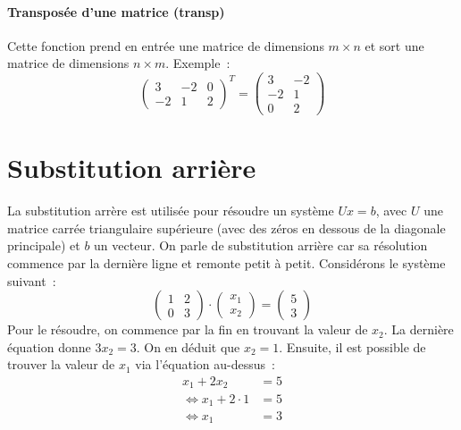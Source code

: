 \documentclass[a4paper, 12pt]{article}
\begin{document}
\paragraph{Transposée d'une matrice (transp)}
Cette fonction prend en entrée une matrice de dimensions $m \times n$ et sort une matrice de dimensions $n \times m$. Exemple~:
\begin{equation*}
     {\begin{pmatrix} 3  & -2 & 0 \\ -2 &  1 & 2   \end{pmatrix}}^T
    = \begin{pmatrix} 3  & -2 \\ -2 &  1 \\ 0 & 2  \end{pmatrix}
\end{equation*}

\newpage
\section{Substitution arrière}\label{app:back_sub}
La substitution arrère est utilisée pour résoudre un système $Ux = b$, avec $U$ une matrice carrée triangulaire supérieure (avec des zéros en dessous de la diagonale principale) et $b$ un vecteur. On parle de substitution arrière car sa résolution commence par la dernière ligne et remonte petit à petit. Considérons le système suivant~:
\begin{equation*}
          \begin{pmatrix} 1 & 2 \\ 0 & 3 \end{pmatrix}
    \cdot \begin{pmatrix} x_1   \\ x_2   \end{pmatrix}
    =     \begin{pmatrix} 5     \\ 3     \end{pmatrix}
\end{equation*}
Pour le résoudre, on commence par la fin en trouvant la valeur de $x_2$. La dernière équation donne $3 x_2 = 3$. On en déduit que $x_2 = 1$. Ensuite, il est possible de trouver la valeur de $x_1$ via l'équation au-dessus~:
\begin{align*}
                    x_1 + 2       x_2 &= 5 \\
    \Leftrightarrow x_1 + 2 \cdot 1   &= 5 \\
    \Leftrightarrow x_1               &= 3
\end{align*}
\end{document}
